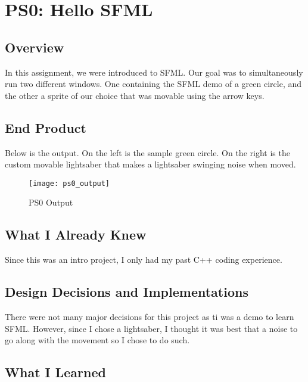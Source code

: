 \section{PS0: Hello SFML}\label{sec:ps0}

\subsection{Overview}\label{sec:ps0:overview} %

In this assignment, we were introduced to SFML. 
Our goal was to simultaneously run two different windows.
One containing the SFML demo of a green circle, and the other a sprite of our choice that was movable using the arrow keys.

\subsection{End Product}\label{sec:ps0:accomplish} %

Below is the output.
On the left is the sample green circle. 
On the right is the custom movable lightsaber that makes a lightsaber swinging noise when moved.

\begin{figure}[h]
\centering
\texttt{[image: ps0\_output]}
\caption{PS0 Output}
\label{fig:output}
\end{figure}

\subsection{What I Already Knew}\label{sec:ps0:knew} %

Since this was an intro project, I only had my past C++ coding experience.

\subsection{Design Decisions and Implementations}\label{sec:ps0:decisions} %

There were not many major decisions for this project as ti was a demo to learn SFML.
However, since I chose a lightsaber, I thought it was best that a noise to go along with the movement so I chose to do such.

\subsection{What I Learned}\label{sec:ps0:learned} %

